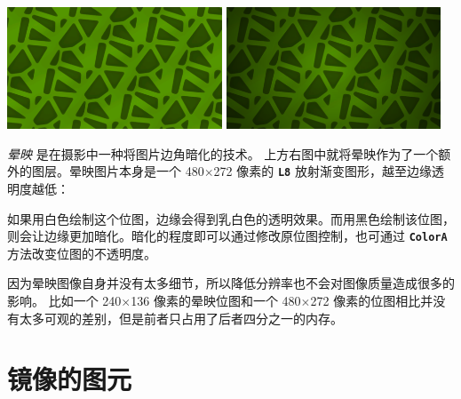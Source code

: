 \documentclass[10pt]{book}
\newcommand{\mach}[1]{\texttt{\textbf{#1}}}
\newcommand{\term}[1]{\emph{#1}\index{#1}}
\begin{document}
\begin{CJK}{UTF8}{gkai}
\begin{center}
\includegraphics[width=0.48\textwidth]{assets/vignette-0.png}
\includegraphics[width=0.48\textwidth]{assets/vignette-1.png}
\end{center}

\term{晕映} 是在摄影中一种将图片边角暗化的技术。
上方右图中就将晕映作为了一个额外的图层。晕映图片本身是一个 480$\times$272 像素的 \mach{L8} 放射渐变图形，越至边缘透明度越低：

\begin{center}
\setlength{\fboxsep}{0pt}
\setlength{\fboxrule}{1pt}
\end{center}

如果用白色绘制这个位图，边缘会得到乳白色的透明效果。而用黑色绘制该位图，则会让边缘更加暗化。暗化的程度即可以通过修改原位图控制，也可通过 \mach{ColorA} 方法改变位图的不透明度。


因为晕映图像自身并没有太多细节，所以降低分辨率也不会对图像质量造成很多的影响。
比如一个 240$\times$136 像素的晕映位图和一个 480$\times$272 像素的位图相比并没有太多可观的差别，但是前者只占用了后者四分之一的内存。

\newpage
\section{镜像的图元}
\label{mirror}


\end{CJK}
\end{document}
